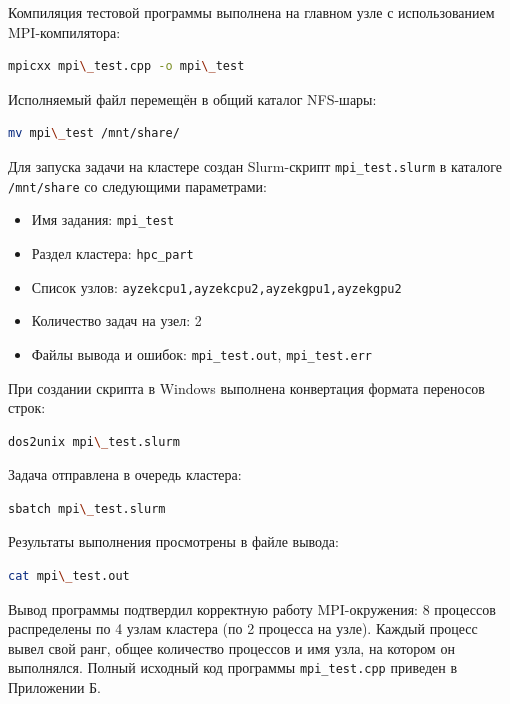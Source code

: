 \documentclass[areaset=advanced]{scrartcl}
\begin{document}
Компиляция тестовой программы выполнена на главном узле с использованием MPI-компилятора:

\begin{lstlisting}[language=bash]
mpicxx mpi\_test.cpp -o mpi\_test
\end{lstlisting}

Исполняемый файл перемещён в общий каталог NFS-шары:

\begin{lstlisting}[language=bash]
mv mpi\_test /mnt/share/
\end{lstlisting}

Для запуска задачи на кластере создан Slurm-скрипт \texttt{mpi\_test.slurm} в каталоге \texttt{/mnt/share} со следующими параметрами:
\begin{itemize}
    \item Имя задания: \texttt{mpi\_test}
    \item Раздел кластера: \texttt{hpc\_part}
    \item Список узлов: \texttt{ayzekcpu1,ayzekcpu2,ayzekgpu1,ayzekgpu2}
    \item Количество задач на узел: 2
    \item Файлы вывода и ошибок: \texttt{mpi\_test.out}, \texttt{mpi\_test.err}
\end{itemize}

При создании скрипта в Windows выполнена конвертация формата переносов строк:

\begin{lstlisting}[language=bash]
dos2unix mpi\_test.slurm
\end{lstlisting}

Задача отправлена в очередь кластера:

\begin{lstlisting}[language=bash]
sbatch mpi\_test.slurm
\end{lstlisting}

Результаты выполнения просмотрены в файле вывода:

\begin{lstlisting}[language=bash]
cat mpi\_test.out
\end{lstlisting}

Вывод программы подтвердил корректную работу MPI-окружения: 8 процессов распределены по 4 узлам кластера (по 2 процесса на узле). Каждый процесс вывел свой ранг, общее количество процессов и имя узла, на котором он выполнялся. Полный исходный код программы \texttt{mpi\_test.cpp} приведен в Приложении Б.
\end{document}
